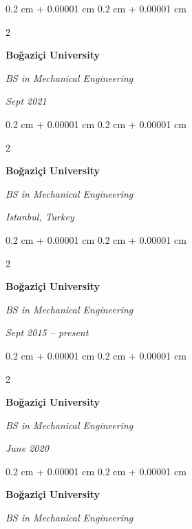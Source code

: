 \documentclass[10pt, letterpaper]{article}
\newenvironment{onecolentry}{
    \begin{adjustwidth}{
        0.2 cm + 0.00001 cm
    }{
        0.2 cm + 0.00001 cm
    }
}{
    \end{adjustwidth}
} %
\newenvironment{twocolentry}[2][]{
    \onecolentry
    \def\secondColumn{#2}
    \setcolumnwidth{\fill, 4.5 cm}
    \begin{paracol}{2}
}{
    \switchcolumn \raggedleft \secondColumn
    \end{paracol}
    \endonecolentry
} %
\begin{document}
        \vspace{0.2 cm}

        \begin{twocolentry}{
            
            
        \textit{Sept 2021}}
            \textbf{Boğaziçi University}

            \textit{BS in Mechanical Engineering}
        \end{twocolentry}



        \vspace{0.2 cm}

        \begin{twocolentry}{
        \textit{Istanbul, Turkey}    
            
        }
            \textbf{Boğaziçi University}

            \textit{BS in Mechanical Engineering}
        \end{twocolentry}



        \vspace{0.2 cm}

        \begin{twocolentry}{
            
            
        \textit{Sept 2015 – present}}
            \textbf{Boğaziçi University}

            \textit{BS in Mechanical Engineering}
        \end{twocolentry}



        \vspace{0.2 cm}

        \begin{twocolentry}{
            
            
        \textit{June 2020}}
            \textbf{Boğaziçi University}

            \textit{BS in Mechanical Engineering}
        \end{twocolentry}



        \vspace{0.2 cm}

        \begin{onecolentry}
            \textbf{Boğaziçi University}

            \textit{BS in Mechanical Engineering}
        \end{onecolentry}
\end{document}
